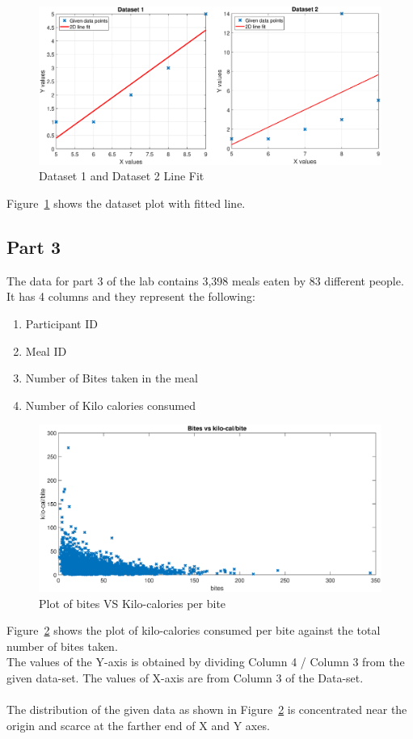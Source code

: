 \documentclass{article}
\begin{document}
\begin{figure}[h]
\centering
\includegraphics[width=\textwidth]{Fit.eps}
\caption{Dataset 1 and Dataset 2 Line Fit}
\label{fig:Fit}
\end{figure}
Figure~\ref{fig:Fit} shows the dataset plot with fitted line.
\newpage

\subsection*{Part 3}
The data for part 3 of the lab contains 3,398 meals eaten by 83 different people. It has 4 columns and they represent the following:
\begin{enumerate}
	\item{Participant ID}
	\item{Meal ID}
	\item{Number of Bites taken in the meal}
	\item{Number of Kilo calories consumed}
\end{enumerate}

\begin{figure}[h]
\centering
\includegraphics[width=\textwidth]{Part3_Dataplot.eps}
\caption{Plot of bites VS Kilo-calories per bite }
\label{fig:bites}
\end{figure}
\noindent
Figure~\ref{fig:bites} shows the plot of kilo-calories consumed per bite against the total number of bites taken. \\
The values of the Y-axis is obtained by dividing Column 4 / Column 3 from the given data-set. The values of X-axis are from Column 3 of the Data-set. \\
\quad \\
The distribution of the given data as shown in Figure~\ref{fig:bites} is concentrated near the origin and scarce at the farther end of X and Y axes. \\
\end{document}
